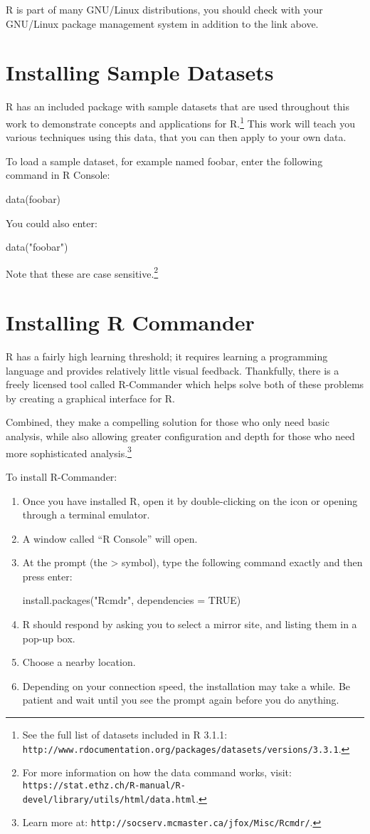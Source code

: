 R is part of many GNU/Linux distributions, you should check with your GNU/Linux package management system in addition to the link above.

\section{Installing Sample Datasets}
R has an included package with sample datasets that are used throughout this work to demonstrate concepts and applications for R.\footnote{See the full list of datasets included in R 3.1.1: \texttt{http://www.rdocumentation.org/packages/datasets/versions/3.3.1}.} This work will teach you various techniques using this data, that you can then apply to your own data.

To load a sample dataset, for example named foobar, enter the following command in R Console:

 data(foobar)

You could also enter:

 data("foobar")

Note that these are case sensitive.\footnote{For more information on how the data command works, visit: \texttt{https://stat.ethz.ch/R-manual/R-devel/library/utils/html/data.html}.}

\section{Installing R Commander}
R has a fairly high learning threshold; it requires learning a programming language and provides relatively little visual feedback. Thankfully, there is a freely licensed tool called R-Commander which helps solve both of these problems by creating a graphical interface for R.

Combined, they make a compelling solution for those who only need basic analysis, while also allowing greater configuration and depth for those who need more sophisticated analysis.\footnote{Learn more at: \texttt{http://socserv.mcmaster.ca/jfox/Misc/Rcmdr/}.}

To install R-Commander:

\begin{enumerate}
 \item Once you have installed R, open it by double-clicking on the icon or opening through a terminal emulator.
 \item A window called “R Console” will open.
 \item At the prompt (the > symbol), type the following command exactly and then press enter:

install.packages("Rcmdr", dependencies = TRUE)

 \item R should respond by asking you to select a mirror site, and listing them in a pop-up box.
 \item Choose a nearby location.
 \item Depending on your connection speed, the installation may take a while. Be patient and wait until you see the prompt again before you do anything.
 \end{enumerate}
 
